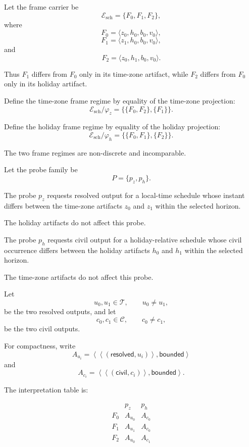 \documentclass[11pt]{article}
\theoremstyle{plain}
\theoremstyle{definition}
\theoremstyle{remark}
\begin{document}
Let the frame carrier be
\[
  \mathcal{E}_{\mathrm{sch}}
  =
  \{
  F_0,
  F_1,
  F_2
  \},
\]
where
\[
  F_0
  =
  \langle
  z_0,
  h_0,
  b_0,
  v_0
  \rangle,
\]
\[
  F_1
  =
  \langle
  z_1,
  h_0,
  b_0,
  v_0
  \rangle,
\]
and
\[
  F_2
  =
  \langle
  z_0,
  h_1,
  b_0,
  v_0
  \rangle.
\]

Thus \(F_1\) differs from \(F_0\)
only in its time-zone artifact,
while \(F_2\) differs from \(F_0\)
only in its holiday artifact.

Define the time-zone frame regime
by equality of the time-zone projection:
\[
  \mathcal{E}_{\mathrm{sch}}/\varphi_z
  =
  \bigl\{
  \{F_0,F_2\},
  \{F_1\}
  \bigr\}.
\]

Define the holiday frame regime
by equality of the holiday projection:
\[
  \mathcal{E}_{\mathrm{sch}}/\varphi_h
  =
  \bigl\{
  \{F_0,F_1\},
  \{F_2\}
  \bigr\}.
\]

The two frame regimes are non-discrete
and incomparable.

Let the probe family be
\[
  P
  =
  \{
  p_z,
  p_h
  \}.
\]

The probe \(p_z\)
requests resolved output
for a local-time schedule
whose instant differs between
the time-zone artifacts \(z_0\) and \(z_1\)
within the selected horizon.

The holiday artifacts do not affect this probe.

The probe \(p_h\)
requests civil output
for a holiday-relative schedule
whose civil occurrence differs between
the holiday artifacts \(h_0\) and \(h_1\)
within the selected horizon.

The time-zone artifacts do not affect this probe.

Let
\[
  u_0,u_1\in\mathcal{T},
  \qquad
  u_0\neq u_1,
\]
be the two resolved outputs,
and let
\[
  c_0,c_1\in\mathcal{C},
  \qquad
  c_0\neq c_1,
\]
be the two civil outputs.

For compactness,
write
\[
  A_{u_i}
  =
  \left\langle
  \left\langle
  (\mathsf{resolved},u_i)
  \right\rangle,
  \mathsf{bounded}
  \right\rangle
\]
and
\[
  A_{c_i}
  =
  \left\langle
  \left\langle
  (\mathsf{civil},c_i)
  \right\rangle,
  \mathsf{bounded}
  \right\rangle.
\]

The interpretation table is:

\[
  \begin{array}{c|cc}
        & p_z     & p_h     \\
    \hline
    F_0 & A_{u_0} & A_{c_0} \\
    F_1 & A_{u_1} & A_{c_0} \\
    F_2 & A_{u_0} & A_{c_1}
  \end{array}
\]
\end{document}
